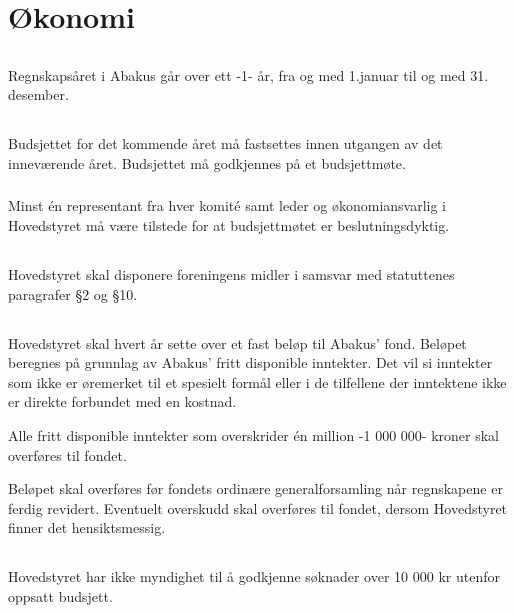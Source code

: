 \section{Økonomi}

\subsection{}
Regnskapsåret i Abakus går over ett -1- år, fra og med 1.januar til og med 31. desember.

\subsection{}
\subsubsection{}
Budsjettet for det kommende året må fastsettes innen utgangen av det inneværende året. Budsjettet må godkjennes på et budsjettmøte.

\subsubsection{}
Minst én representant fra hver komité samt leder og økonomiansvarlig i Hovedstyret må være tilstede for at budsjettmøtet er beslutningsdyktig.

\subsection{}
Hovedstyret skal disponere foreningens midler i samsvar med statuttenes
paragrafer §2 og §10.

\subsection{}
Hovedstyret skal hvert år sette over et fast beløp til Abakus' fond. Beløpet
beregnes på grunnlag av Abakus' fritt disponible inntekter. Det vil si
inntekter som ikke er øremerket til et spesielt formål eller i de tilfellene
der inntektene ikke er direkte forbundet med en kostnad.

Alle fritt disponible inntekter som overskrider én million -1 000 000- kroner
skal overføres til fondet.

Beløpet skal overføres før fondets ordinære generalforsamling når regnskapene
er ferdig revidert. Eventuelt overskudd skal overføres til fondet, dersom
Hovedstyret finner det hensiktsmessig.

\subsection{}
Hovedstyret har ikke myndighet til å godkjenne søknader over 10 000 kr utenfor
oppsatt budsjett.
